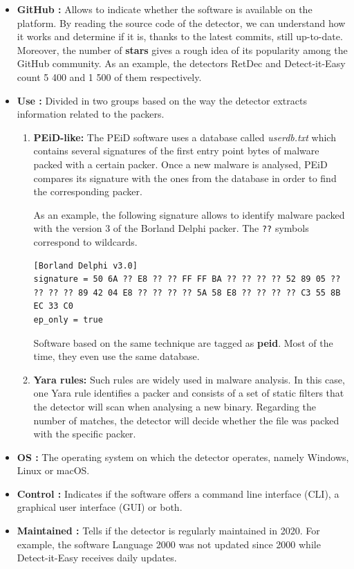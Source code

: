 \begin{itemize}
    \item \textbf{GitHub :} Allows to indicate whether the software is available on the platform. By reading the source code of the detector, we can understand how it works and determine if it is, thanks to the latest commits, still up-to-date. Moreover, the number of \textbf{stars} gives a rough idea of its popularity among the GitHub community. As an example, the detectors RetDec and Detect-it-Easy count 5 400 and 1 500 of them respectively.
    \item \textbf{Use :} Divided in two groups based on the way the detector extracts information related to the packers.
        \begin{enumerate}
            \item \textbf{PEiD-like:} The PEiD software uses a database called \textit{userdb.txt} which contains several signatures of the first entry point bytes of malware packed with a certain packer. Once a new malware is analysed, PEiD compares its signature with the ones from the database in order to find the corresponding packer.
            
            As an example, the following signature allows to identify malware packed with the version 3 of the Borland Delphi packer. The \texttt{??} symbols correspond to wildcards.
            
{\noindent\begin{lstlisting}
[Borland Delphi v3.0]
signature = 50 6A ?? E8 ?? ?? FF FF BA ?? ?? ?? ?? 52 89 05 ?? ?? ?? ?? 89 42 04 E8 ?? ?? ?? ?? 5A 58 E8 ?? ?? ?? ?? C3 55 8B EC 33 C0
ep_only = true
\end{lstlisting}}
            Software based on the same technique are tagged as \textbf{peid}. Most of the time, they even use the same database.
            \item \textbf{Yara rules:} Such rules are widely used in malware analysis. In this case, one Yara rule identifies a packer and consists of a set of static filters that the detector will scan when analysing a new binary. Regarding the number of matches, the detector will decide whether the file was packed with the specific packer.
        \end{enumerate}
    \item \textbf{OS :} The operating system on which the detector operates, namely Windows, Linux or macOS.
    \item \textbf{Control :} Indicates if the software offers a command line interface (CLI), a graphical user interface (GUI) or both.
    \item \textbf{Maintained :} Tells if the detector is regularly maintained in 2020. For example, the software Language 2000 was not updated since 2000 while Detect-it-Easy receives daily updates.
\end{itemize}

